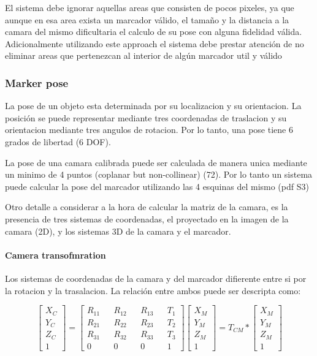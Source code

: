 \documentclass[runningheads]{llncs}
\begin{document}
	El sistema debe ignorar aquellas areas que consisten de pocos pixeles, ya que aunque en esa area exista un marcador válido, el tamaño y la distancia a la camara del mismo dificultaria el calculo de su pose con alguna fidelidad válida. Adicionalmente utilizando este approach el sistema debe prestar atención de no eliminar areas que pertenezcan al interior de algún marcador util y válido
	
	\subsubsection{Marker pose}
	
	La pose de un objeto esta determinada por su localizacion y su orientacion. La posición se puede representar mediante tres coordenadas de traslacion y su orientacion mediante tres angulos de rotacion. Por lo tanto, una pose tiene 6 grados de libertad (6 DOF).
	
	La pose de una camara calibrada puede ser calculada de manera unica mediante un minimo de 4 puntos (coplanar but non-collinear) (72). Por lo tanto un sistema puede calcular la pose del marcador utilizando las 4 esquinas del mismo (pdf S3)
	
	Otro detalle a considerar a la hora de calcular la matriz de la camara, es la presencia de tres sistemas de coordenadas, el proyectado en la imagen de la camara (2D), y los sistemas 3D de la camara y el marcador.
	
	\paragraph{Camera transofmration}
	Los sistemas de coordenadas de la camara y del marcador difierente entre si por la rotacion y la trasalacion. La relación entre ambos puede ser descripta como:
	
	\[
	\begin{bmatrix}
	X_{C} \\
	Y_{C} \\
	Z_{C} \\
	1
	\end{bmatrix} =
	\begin{bmatrix}
	R_{11} && R_{12} && R_{13} && T_{1} \\
	R_{21} && R_{22} && R_{23} && T_{2} \\
	R_{31} && R_{32} && R_{33} && T_{3} \\
	0 && 0 && 0 && 1
	\end{bmatrix}
	\begin{bmatrix}
	X_{M} \\
	Y_{M} \\
	Z_{M} \\
	1
	\end{bmatrix} = 
	T_{CM} * \begin{bmatrix}
	X_{M} \\
	Y_{M} \\
	Z_{M} \\
	1
	\end{bmatrix}
	\]
	
\end{document}
